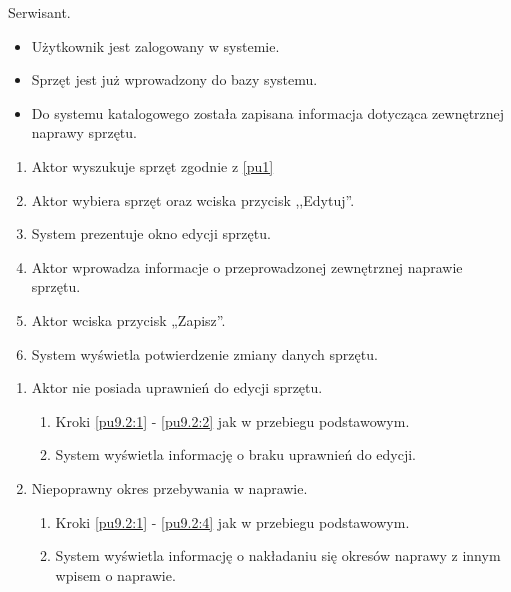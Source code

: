 Serwisant.

\begin{itemize}
\item Użytkownik jest zalogowany w systemie.
\item Sprzęt jest już wprowadzony do bazy systemu.
\end{itemize}

\begin{itemize}
\item Do systemu katalogowego została zapisana informacja dotycząca zewnętrznej naprawy sprzętu.
\end{itemize}

\begin{enumerate}
	\item \label{pu9.2:1} Aktor wyszukuje sprzęt zgodnie z \ref{pu1}
	\item \label{pu9.2:2} Aktor wybiera sprzęt oraz wciska przycisk ,,Edytuj''.
	\item System prezentuje okno edycji sprzętu.
	\item \label{pu9.2:4} Aktor wprowadza informacje o przeprowadzonej zewnętrznej naprawie sprzętu.
	\item Aktor wciska przycisk „Zapisz”.
	\item System wyświetla potwierdzenie zmiany danych sprzętu.
\end{enumerate}

\begin{enumerate}
	\item Aktor nie posiada uprawnień do edycji sprzętu.
	\begin{enumerate}[label*=\arabic*.]
		\item Kroki \ref{pu9.2:1} - \ref{pu9.2:2} jak w przebiegu podstawowym.
		\item System wyświetla informację o braku uprawnień do edycji.
	\end{enumerate}
	\item Niepoprawny okres przebywania w naprawie.
	\begin{enumerate}[label*=\arabic*.]
		\item Kroki \ref{pu9.2:1} - \ref{pu9.2:4} jak w przebiegu podstawowym.
		\item System wyświetla informację o nakładaniu się okresów naprawy z innym wpisem o naprawie.
	\end{enumerate}
\end{enumerate}

